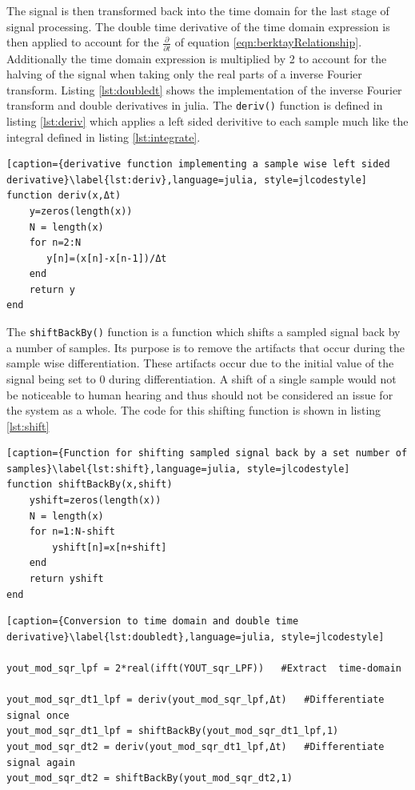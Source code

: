 The signal is then transformed back into the time domain for the last stage of signal processing. The double time derivative of the time domain expression is then applied to account for the $\frac{\partial}{\partial t}$ of equation \ref{eqn:berktayRelationship}. Additionally the time domain expression is multiplied by 2 to account for the halving of the signal when taking only the real parts of a inverse Fourier transform. Listing \ref{lst:doubledt} shows the implementation of the inverse Fourier transform and double derivatives in julia. The \texttt{deriv()} function is defined in listing \ref{lst:deriv} which applies a left sided derivitive to each sample much like the integral defined in listing \ref{lst:integrate}.

\begin{lstlisting}[caption={derivative function implementing a sample wise left sided derivative}\label{lst:deriv},language=julia, style=jlcodestyle]
function deriv(x,Δt)
    y=zeros(length(x))
    N = length(x)
    for n=2:N
       y[n]=(x[n]-x[n-1])/Δt
    end
    return y
end
\end{lstlisting}

The \texttt{shiftBackBy()} function is a function which shifts a sampled signal back by a number of samples. Its purpose is to remove the artifacts that occur during the sample wise differentiation. These artifacts occur due to the initial value of the signal being set to 0 during differentiation. A shift of a single sample would not be noticeable to human hearing and thus should not be considered an issue for the system as a whole. The code for this shifting function is shown in listing \ref{lst:shift}
\begin{lstlisting}[caption={Function for shifting sampled signal back by a set number of samples}\label{lst:shift},language=julia, style=jlcodestyle]
function shiftBackBy(x,shift)
    yshift=zeros(length(x))
    N = length(x)
    for n=1:N-shift
        yshift[n]=x[n+shift]
    end
    return yshift
end
\end{lstlisting}

\begin{lstlisting}[caption={Conversion to time domain and double time derivative}\label{lst:doubledt},language=julia, style=jlcodestyle]

yout_mod_sqr_lpf = 2*real(ifft(YOUT_sqr_LPF))   #Extract  time-domain

yout_mod_sqr_dt1_lpf = deriv(yout_mod_sqr_lpf,Δt)   #Differentiate signal once
yout_mod_sqr_dt1_lpf = shiftBackBy(yout_mod_sqr_dt1_lpf,1)
yout_mod_sqr_dt2 = deriv(yout_mod_sqr_dt1_lpf,Δt)   #Differentiate signal again
yout_mod_sqr_dt2 = shiftBackBy(yout_mod_sqr_dt2,1)
\end{lstlisting}

